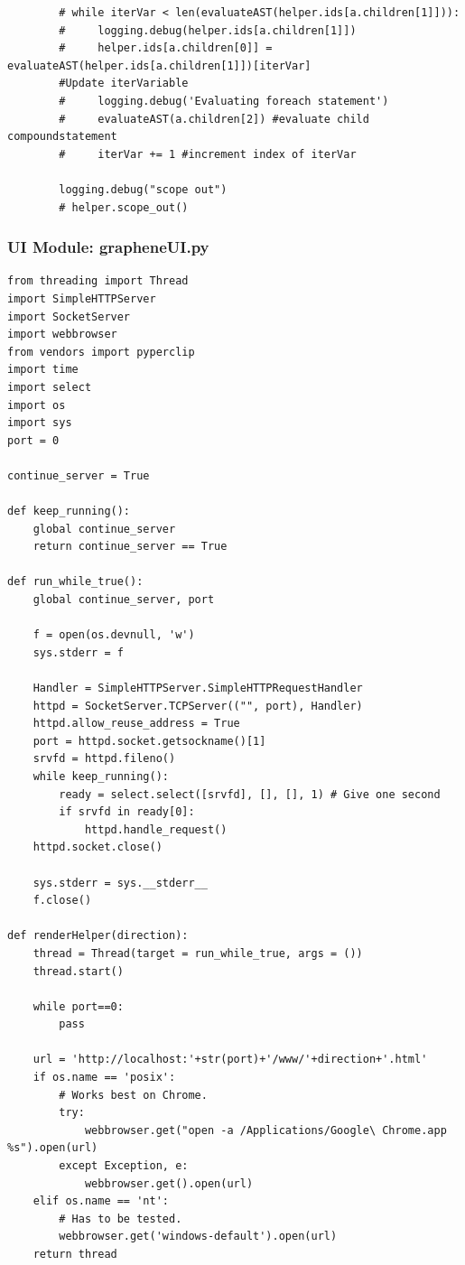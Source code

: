 \documentclass[a4paper]{article}
\begin{document}
\begin{verbatim}
        # while iterVar < len(evaluateAST(helper.ids[a.children[1]])):
        #     logging.debug(helper.ids[a.children[1]])
        #     helper.ids[a.children[0]] = evaluateAST(helper.ids[a.children[1]])[iterVar] 
        #Update iterVariable
        #     logging.debug('Evaluating foreach statement')
        #     evaluateAST(a.children[2]) #evaluate child compoundstatement
        #     iterVar += 1 #increment index of iterVar
        
        logging.debug("scope out")
        # helper.scope_out()
\end{verbatim}

\subsubsection{UI Module: grapheneUI.py}
\begin{verbatim}
from threading import Thread
import SimpleHTTPServer
import SocketServer
import webbrowser
from vendors import pyperclip
import time
import select
import os
import sys
port = 0

continue_server = True

def keep_running():
    global continue_server
    return continue_server == True

def run_while_true():
    global continue_server, port

    f = open(os.devnull, 'w')
    sys.stderr = f
    
    Handler = SimpleHTTPServer.SimpleHTTPRequestHandler
    httpd = SocketServer.TCPServer(("", port), Handler)
    httpd.allow_reuse_address = True
    port = httpd.socket.getsockname()[1]
    srvfd = httpd.fileno()
    while keep_running():
        ready = select.select([srvfd], [], [], 1) # Give one second
        if srvfd in ready[0]:
            httpd.handle_request()
    httpd.socket.close()

    sys.stderr = sys.__stderr__
    f.close()

def renderHelper(direction):
    thread = Thread(target = run_while_true, args = ())
    thread.start()
    
    while port==0:
        pass

    url = 'http://localhost:'+str(port)+'/www/'+direction+'.html'
    if os.name == 'posix':
        # Works best on Chrome.
        try:
            webbrowser.get("open -a /Applications/Google\ Chrome.app %s").open(url)
        except Exception, e:
            webbrowser.get().open(url)
    elif os.name == 'nt':
        # Has to be tested.
        webbrowser.get('windows-default').open(url)
    return thread


\end{verbatim}
\end{document}
